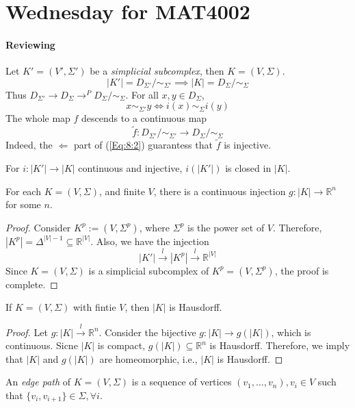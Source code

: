 \section{Wednesday for MAT4002}
\paragraph{Reviewing}
Let $K'=(V',\Sigma')$ be a \emph{simplicial subcomplex}, then $K=(V,\Sigma)$.
\[
|K'| = D_{\Sigma'}/\sim_{\Sigma'}\implies
|K| = D_{\Sigma}/\sim_{\Sigma}
\]
Thus $D_{\Sigma'}\to D_{\Sigma}\to^PD_{\Sigma}/\sim_{\Sigma}$.
For all $x,y\in D_{\Sigma}$, 
\begin{equation}\label{Eq:8:2}
x\sim_{\Sigma'}y\Longleftrightarrow
i(x)\sim_{\Sigma}i(y)
\end{equation}
The whole map $f$ descends to a continuous map
\[
\tilde{f}:D_{\Sigma'}/\sim_{\Sigma'}\to D_{\Sigma}/\sim_{\Sigma}
\]
Indeed, the $\Longleftarrow$ part of (\ref{Eq:8:2}) guarantess that $\tilde{f}$ is injective.

For $i:|K'|\to |K|$ continuous and injective, $i(|K'|)$ is closed in $|K|$.


\begin{proposition}
For each $K=(V,\Sigma)$, and finite $V$, there is a continuous injection $g:|K|\to\mathbb{R}^n$ for some $n$.
\end{proposition}

\begin{proof}
Consider $K^p:=(V,\Sigma^p)$, where $\Sigma^p$ is the power set of $V$.
Therefore, $|K^p| = \Delta^{|V|-1}\subseteq\mathbb{R}^{|V|}$. Also, we have the injection
\[
|K'|\xrightarrow{l}|K^p|\xrightarrow{l}\mathbb{R}^{|V|}
\]
Since $K=(V,\Sigma)$ is a simplicial subcomplex of $K^p=(V,\Sigma^p)$, the proof is complete.
\end{proof}

\begin{proposition}[Hausdorff]
If $K=(V,\Sigma)$ with fintie $V$, then $|K|$ is Hausdorff.
\end{proposition}

\begin{proof}
Let $g:|K|\xrightarrow{l}\mathbb{R}^n$.
Consider the bijective $g:|K|\to g(|K|)$, which is continuous.
Sicne $|K|$ is compact, $g(|K|)\subseteq \mathbb{R}^n$ is Hausdorff.
Therefore, we imply that $|K|$ and $g(|K|)$ are homeomorphic, i.e., $|K|$ is Hausdorff.
\end{proof}

\begin{definition}
An \emph{edge path} of $K=(V,\Sigma)$ is a sequence of vertices $(v_1,\dots,v_n), v_i\in V$ such that $\{v_i,v_{i+1}\}\in\Sigma,\forall i$.
\end{definition}

